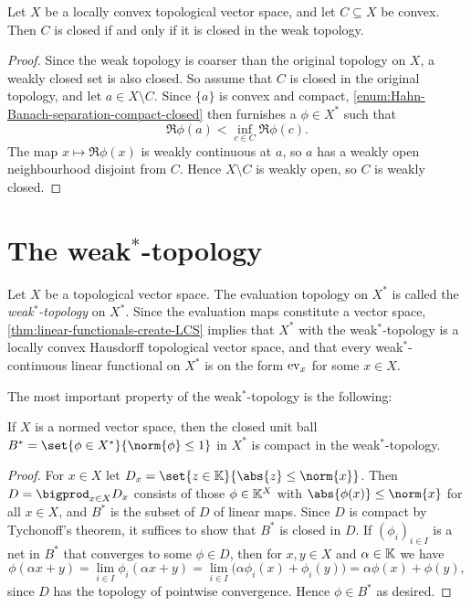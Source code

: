 \documentclass[article, a4paper, 11pt, oneside]{memoir}
\numberwithin{equation}{chapter}
\begin{document}
\begin{proposition}
    Let $X$ be a locally convex topological vector space, and let $C \subseteq X$ be convex. Then $C$ is closed if and only if it is closed in the weak topology.
\end{proposition}

\begin{proof}
    Since the weak topology is coarser than the original topology on $X$, a weakly closed set is also closed. So assume that $C$ is closed in the original topology, and let $a \in X \setminus C$. Since $\{a\}$ is convex and compact, \cref{enum:Hahn-Banach-separation-compact-closed} then furnishes a $\phi \in X^*$ such that
    \begin{equation*}
        \Re \phi(a)
            < \inf_{c \in C} \Re \phi(c).
    \end{equation*}
    The map $x \mapsto \Re \phi(x)$ is weakly continuous at $a$, so $a$ has a weakly open neighbourhood disjoint from $C$. Hence $X \setminus C$ is weakly open, so $C$ is weakly closed.
\end{proof}


\section[The weak*-topology][The weak$^*$-topology]{The weak$^*$-topology}

Let $X$ be a topological vector space. The evaluation topology on $X^*$ is called the \emph{weak$^*$-topology} on $X^*$. Since the evaluation maps constitute a vector space, \cref{thm:linear-functionals-create-LCS} implies that $X^*$ with the weak$^*$-topology is a locally convex Hausdorff topological vector space, and that every weak$^*$-continuous linear functional on $X^*$ is on the form $\mathrm{ev}_x$ for some $x \in X$.

The most important property of the weak$^*$-topology is the following:

\begin{theorem}
    If $X$ is a normed vector space, then the closed unit ball $B^* = \set{\phi \in X^*}{\norm{\phi} \leq 1}$ in $X^*$ is compact in the weak$^*$-topology.
\end{theorem}

\begin{proof}
    For $x \in X$ let $D_x = \set{z \in \field}{\abs{z} \leq \norm{x}}$. Then $D = \bigprod_{x \in X} D_x$ consists of those $\phi \in \mathbb{K}^X$ with $\abs{\phi(x)} \leq \norm{x}$ for all $x \in X$, and $B^*$ is the subset of $D$ of linear maps. Since $D$ is compact by Tychonoff's theorem, it suffices to show that $B^*$ is closed in $D$. If $(\phi_i)_{i \in I}$ is a net in $B^*$ that converges to some $\phi \in D$, then for $x,y \in X$ and $\alpha \in \mathbb{K}$ we have
    \begin{equation*}
        \phi(\alpha x + y)
            = \lim_{i \in I} \phi_i(\alpha x + y)
            = \lim_{i \in I} \bigl( \alpha \phi_i(x) + \phi_i(y) \bigr)
            = \alpha \phi(x) + \phi(y),
    \end{equation*}
    since $D$ has the topology of pointwise convergence. Hence $\phi \in B^*$ as desired.
\end{proof}
\end{document}
